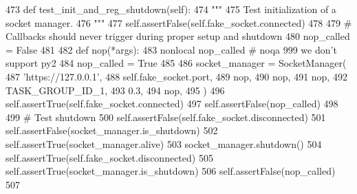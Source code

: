 \begin{DoxyCode}
473     \textcolor{keyword}{def }test\_init\_and\_reg\_shutdown(self):
474         \textcolor{stringliteral}{"""}
475 \textcolor{stringliteral}{        Test initialization of a socket manager.}
476 \textcolor{stringliteral}{        """}
477         self.assertFalse(self.fake\_socket.connected)
478 
479         \textcolor{comment}{# Callbacks should never trigger during proper setup and shutdown}
480         nop\_called = \textcolor{keyword}{False}
481 
482         \textcolor{keyword}{def }nop(*args):
483             nonlocal nop\_called  \textcolor{comment}{# noqa 999 we don't support py2}
484             nop\_called = \textcolor{keyword}{True}
485 
486         socket\_manager = SocketManager(
487             \textcolor{stringliteral}{'https://127.0.0.1'},
488             self.fake\_socket.port,
489             nop,
490             nop,
491             nop,
492             TASK\_GROUP\_ID\_1,
493             0.3,
494             nop,
495         )
496         self.assertTrue(self.fake\_socket.connected)
497         self.assertFalse(nop\_called)
498 
499         \textcolor{comment}{# Test shutdown}
500         self.assertFalse(self.fake\_socket.disconnected)
501         self.assertFalse(socket\_manager.is\_shutdown)
502         self.assertTrue(socket\_manager.alive)
503         socket\_manager.shutdown()
504         self.assertTrue(self.fake\_socket.disconnected)
505         self.assertTrue(socket\_manager.is\_shutdown)
506         self.assertFalse(nop\_called)
507 
\end{DoxyCode}
\mbox{\label{classparlai_1_1mturk_1_1core_1_1legacy__2018_1_1test_1_1test__socket__manager_1_1TestSocketManagerSetupAndFunctions_a633836e55e3a0da0e9fe29e3a8cbfe5b}} 
